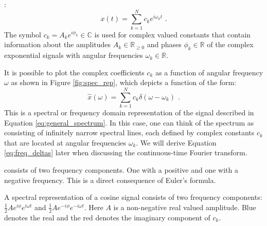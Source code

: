 :
\begin{equation}
x(t) = \sum_{k=1}^N c_k e^{i\omega_k t} \,\,.
\label{eq:general_spectrum}
\end{equation}
The symbol $c_k = A_k e^{i\phi_k} \in \mathbb{C}$ is used for complex valued constants that contain information about the amplitudes $A_k \in \mathbb{R}_{\ge 0}$ and phases $\phi_k \in \mathbb{R}$ of the complex exponential signals with angular frequencies $\omega_k \in \mathbb{R}$.

It is possible to plot the complex coefficients $c_k$ as a function of angular frequency $\omega$ as shown in Figure \ref{fig:spec_rep}, which depicts a function of the form:
\begin{equation}
\hat{x}(\omega) = \sum_{k=1}^N c_k \delta(\omega - \omega_k) \,\,.
\label{eq:freq_deltas}
\end{equation}
This is a spectral or frequency domain representation of the signal described in Equation \ref{eq:general_spectrum}.  In this case, one can think of the spectrum as consisting of infinitely narrow spectral lines, each defined by complex constants $c_k$ that are located at angular frequencies $\omega_k$. We will derive
Equation \ref{eq:freq_deltas} later when discussing the
continuous-time Fourier transform.

 consists of two frequency components. One with a positive and one with a negative frequency. This is a direct consequence of Euler's formula. 

\begin{marginfigure}
\begin{center}
\end{center}
\caption{A spectral representation of a cosine signal consists of two frequency components: $\frac{1}{2}Ae^{i\phi}e^{i\omega t}$ and $\frac{1}{2}Ae^{-i\phi}e^{-i\omega t}$. Here $A$ is a non-negative real valued amplitude. Blue denotes the real and the red denotes the imaginary component of $c_k$.}
\label{fig:exspecsin}
\end{marginfigure}

